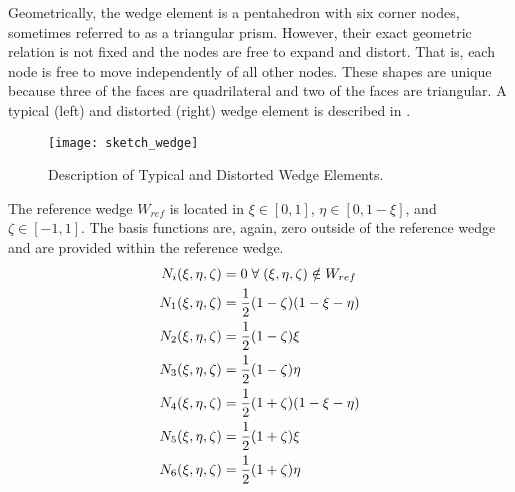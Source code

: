       Geometrically, the wedge element is a pentahedron with six corner nodes,
      sometimes referred to as a triangular prism. However,
      their exact geometric relation is not fixed and the nodes are free to 
      expand and distort. That is, each node is free to move independently of
      all other nodes. These shapes are unique because three of the faces are
      quadrilateral and two of the faces are triangular. A typical (left) and 
      distorted (right) wedge element is described in .
      \begin{figure}
        \centering
        \texttt{[image: sketch\_wedge]}
        \caption{Description of Typical and Distorted Wedge Elements.}
        \label{fig:sketch_wedge}
      \end{figure}
      The reference wedge $W_{ref}$ is located in 
      $\xi \in [0,1]$, $\eta \in [0,1-\xi]$, and $\zeta \in [-1,1]$. The basis
      functions are, again, zero outside of the reference wedge and are provided
      within the reference wedge.
      \begin{align}
        N_i(\xi,\eta,\zeta) &= 0 \; \forall \; (\xi,\eta,\zeta)
          \notin W_{ref} \\
        N_1(\xi,\eta,\zeta) &= \frac{1}{2} (1-\zeta)(1-\xi-\eta) \\
        N_2(\xi,\eta,\zeta) &= \frac{1}{2} (1-\zeta)\xi \\
        N_3(\xi,\eta,\zeta) &= \frac{1}{2} (1-\zeta)\eta \\
        N_4(\xi,\eta,\zeta) &= \frac{1}{2} (1+\zeta)(1-\xi-\eta) \\
        N_5(\xi,\eta,\zeta) &= \frac{1}{2} (1+\zeta)\xi \\
        N_6(\xi,\eta,\zeta) &= \frac{1}{2} (1+\zeta)\eta 
      \end{align}

